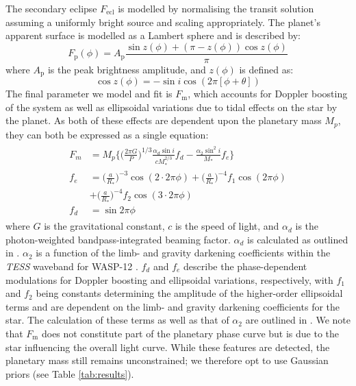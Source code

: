 \documentclass[fleqn,usenatbib]{mnras}
\begin{document}
The secondary eclipse $F_\mathrm{ecl}$ is modelled by normalising the transit solution assuming a uniformly bright source and scaling appropriately. The planet's apparent surface is modelled as a Lambert sphere and is described by:
\begin{equation}
    F_{\mathrm{p}}(\phi) = A_{\mathrm{p}} \frac{\sin{z(\phi)}+(\pi - z(\phi)) \cos{z(\phi)}}{\pi}
	\label{eq:phase1}
\end{equation}
\noindent where $A_{\mathrm{p}}$ is the peak brightness amplitude, and $z(\phi)$ is defined as:
\begin{equation}
    \cos{z(\phi)} = - \sin{i} \cos{(2\pi[\phi+\theta])}
	\label{eq:phase2}
\end{equation}
The final parameter we model and fit is $F_{\mathrm{m}}$, which accounts for Doppler boosting of the system as well as ellipsoidal variations due to tidal effects on the star by the planet. As both of these effects are dependent upon the planetary mass $M_{p}$, they can both be expressed as a single equation:
\begin{eqnarray}
    \begin{aligned}
    F_{m} &= M_{p} \Bigg\{ \bigg(\frac{2 \pi G}{P}\bigg)^{1/3} \frac{\alpha_{d} \sin{i}}{cM_{*}^{2/3}}f_{d} - \frac{\alpha_{2} \sin^{2}{i}}{M_{*}} f_{e} \Bigg\}\\
    f_{e} &= \bigg(\frac{a}{R_{*}}\bigg)^{-3}\cos{(2 \cdot 2\pi \phi)} + \bigg(\frac{a}{R_{*}}\bigg)^{-4}f_{1}\cos{(2\pi \phi)} \\
    &+ \bigg(\frac{a}{R_{*}}\bigg)^{-4}f_{2}\cos{(3 \cdot 2\pi \phi)} \\
    f_{d} &= \sin{2\pi\phi}
    \end{aligned}
\end{eqnarray}
where $G$ is the gravitational constant, $c$ is the speed of light, and $\alpha_{d}$ is the photon-weighted bandpass-integrated beaming factor. $\alpha_{d}$ is calculated as outlined in \citet{doppler1, doppler2}. $\alpha_{2}$ is a function of the limb- and gravity darkening coefficients within the \textit{TESS} waveband for WASP-12 \citep{claret}. $f_{d}$ and $f_{e}$ describe the phase-dependent modulations for Doppler boosting and ellipsoidal variations, respectively, with $f_{1}$ and $f_{2}$ being constants determining the amplitude of the higher-order ellipsoidal terms and are dependent on the limb- and gravity darkening coefficients for the star. The calculation of these terms as well as that of $\alpha_{2}$ are outlined in \citet{esteves2013}. We note that $F_{\mathrm{m}}$ does not constitute part of the planetary phase curve but is due to the star influencing the overall light curve. While these features are detected, the planetary mass still remains unconstrained; we therefore opt to use Gaussian priors (see Table \ref{tab:results}).
\end{document}
